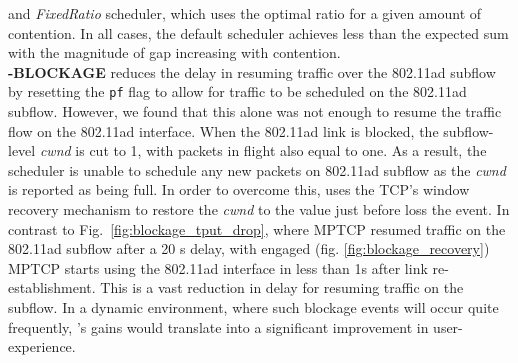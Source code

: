 and \emph{FixedRatio} scheduler, which uses the optimal ratio for a
given amount of contention. In all cases, the default scheduler
achieves less than the expected sum with the magnitude of gap
increasing with contention.
\\
\noindent\textbf{\name-BLOCKAGE} reduces the delay in resuming traffic over the 802.11ad
subflow by resetting the {{\tt pf}} flag to allow for traffic to be
scheduled on the 802.11ad subflow. However, we found that this alone
was not enough to resume the traffic flow on the 802.11ad
interface. When the 802.11ad link is blocked, the
subflow-level \emph{cwnd} is cut to 1, with packets in flight also
equal to one. As a result, the scheduler is unable to schedule any new
packets on 802.11ad subflow as the \emph{cwnd} is reported as being
full. In order to overcome this, \name uses the TCP's window recovery
mechanism to restore the \emph{cwnd} to the value just before loss the
event. In contrast to Fig.~\ref{fig:blockage_tput_drop}, where MPTCP resumed traffic on the
802.11ad subflow after a 20 s delay, with \name engaged (fig. \ref{fig:blockage_recovery}) 
MPTCP starts using the 802.11ad interface in less than 1s after link re-establishment. This
is a vast reduction in delay for resuming traffic on the subflow. In a
dynamic environment, where such blockage events will occur quite
frequently, \name's gains would translate into a significant
improvement in user-experience.

